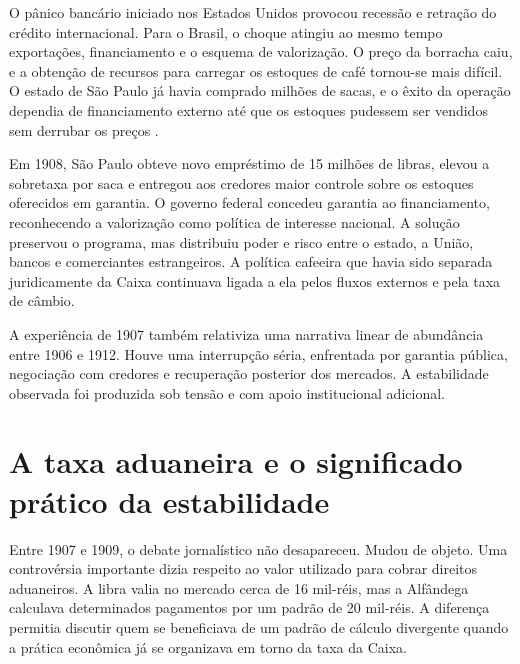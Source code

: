 O pânico bancário iniciado nos Estados Unidos provocou recessão e retração do crédito internacional. Para o Brasil, o choque atingiu ao mesmo tempo exportações, financiamento e o esquema de valorização. O preço da borracha caiu, e a obtenção de recursos para carregar os estoques de café tornou-se mais difícil. O estado de São Paulo já havia comprado milhões de sacas, e o êxito da operação dependia de financiamento externo até que os estoques pudessem ser vendidos sem derrubar os preços \cite{fritsch1990,francolago2011}.

Em 1908, São Paulo obteve novo empréstimo de 15 milhões de libras, elevou a sobretaxa por saca e entregou aos credores maior controle sobre os estoques oferecidos em garantia. O governo federal concedeu garantia ao financiamento, reconhecendo a valorização como política de interesse nacional. A solução preservou o programa, mas distribuiu poder e risco entre o estado, a União, bancos e comerciantes estrangeiros. A política cafeeira que havia sido separada juridicamente da Caixa continuava ligada a ela pelos fluxos externos e pela taxa de câmbio.

A experiência de 1907 também relativiza uma narrativa linear de abundância entre 1906 e 1912. Houve uma interrupção séria, enfrentada por garantia pública, negociação com credores e recuperação posterior dos mercados. A estabilidade observada foi produzida sob tensão e com apoio institucional adicional.


\section{A taxa aduaneira e o significado prático da estabilidade}

Entre 1907 e 1909, o debate jornalístico não desapareceu. Mudou de objeto. Uma controvérsia importante dizia respeito ao valor utilizado para cobrar direitos aduaneiros. A libra valia no mercado cerca de 16 mil-réis, mas a Alfândega calculava determinados pagamentos por um padrão de 20 mil-réis. A diferença permitia discutir quem se beneficiava de um padrão de cálculo divergente quando a prática econômica já se organizava em torno da taxa da Caixa.


